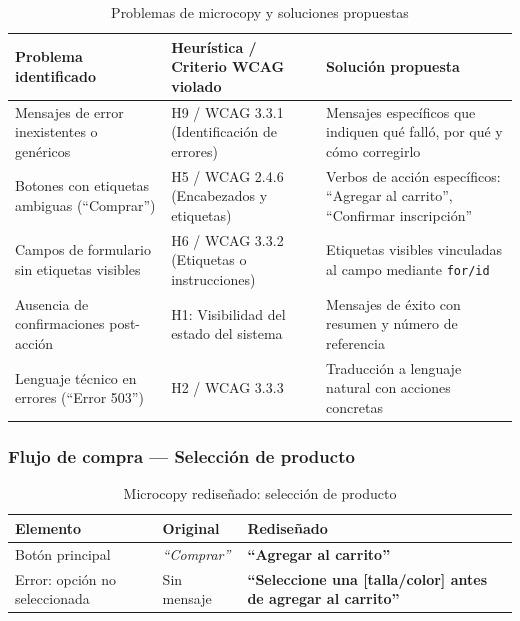 \documentclass[conference]{IEEEtran}
\newcommand{\malEjemplo}[1]{\textcolor{colorMalo}{\textit{``#1''}}}
\newcommand{\buenEjemplo}[1]{\textcolor{colorBueno}{\textbf{``#1''}}}
\begin{document}
\begin{table}[t]
\centering
\caption{Problemas de microcopy y soluciones propuestas}
\label{tab:problemas-soluciones}
\renewcommand{\arraystretch}{1.2}
\begin{tabular}{|p{3.5cm}|p{4.5cm}|p{7cm}|}
\hline
\textbf{Problema identificado} & \textbf{Heurística / Criterio WCAG violado} & \textbf{Solución propuesta} \\
\hline
Mensajes de error inexistentes o genéricos & H9 / WCAG 3.3.1 (Identificación de errores) & Mensajes específicos que indiquen qué falló, por qué y cómo corregirlo \\
\hline
Botones con etiquetas ambiguas (``Comprar'') & H5 / WCAG 2.4.6 (Encabezados y etiquetas) & Verbos de acción específicos: ``Agregar al carrito'', ``Confirmar inscripción'' \\
\hline
Campos de formulario sin etiquetas visibles & H6 / WCAG 3.3.2 (Etiquetas o instrucciones) & Etiquetas visibles vinculadas al campo mediante \texttt{for/id} \\
\hline
Ausencia de confirmaciones post-acción & H1: Visibilidad del estado del sistema & Mensajes de éxito con resumen y número de referencia \\
\hline
Lenguaje técnico en errores (``Error 503'') & H2 / WCAG 3.3.3 & Traducción a lenguaje natural con acciones concretas \\
\hline
\end{tabular}
\end{table}

\subsubsection{Flujo de compra — Selección de producto}

\begin{table}[H]
\centering
\caption{Microcopy rediseñado: selección de producto}
\label{tab:producto}
\setlength{\tabcolsep}{3pt}
\renewcommand{\arraystretch}{1.2}
\begin{tabular}{|p{1.8cm}|p{2.2cm}|p{3cm}|}
\hline
\textbf{Elemento} & \textbf{Original} & \textbf{Rediseñado} \\
\hline
Botón principal & \malEjemplo{Comprar} & \buenEjemplo{Agregar al carrito} \\
\hline
Error: opción no seleccionada & Sin mensaje & \buenEjemplo{Seleccione una [talla/color] antes de agregar al carrito} \\
\hline
\end{tabular}
\end{table}
\end{document}
